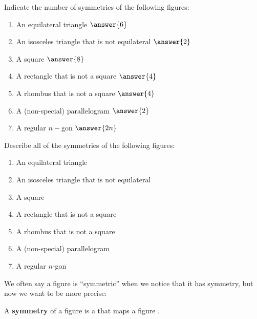 \documentclass[nooutcomes]{ximera}
\begin{document}
\begin{question}
Indicate the number of symmetries of the following figures: 
\begin{enumerate}
\item An equilateral triangle $\answer{6}$
\item An isosceles triangle that is not equilateral $\answer{2}$
\item A square $\answer{8}$
\item A rectangle that is not a square $\answer{4}$
\item A rhombus that is not a square $\answer{4}$
\item A (non-special) parallelogram $\answer{2}$
\item A regular $n-$gon $\answer{2n}$
\end{enumerate}
\end{question}

\begin{question}
Describe all of the symmetries of the following figures: 
\begin{enumerate}
\item An equilateral triangle
\item An isosceles triangle that is not equilateral
\item A square
\item A rectangle that is not a square
\item A rhombus that is not a square
\item A (non-special) parallelogram
\item A regular $n$-gon
\end{enumerate}
\begin{freeResponse}
\begin{hint}
\end{hint}
\end{freeResponse}
\end{question}


\begin{question}
We often say a figure is ``symmetric'' when we notice that it has symmetry, but now we want to be more precise:  

A \textbf{symmetry} of a figure is a  
that maps a figure 
.  
\end{question}
\end{document}

